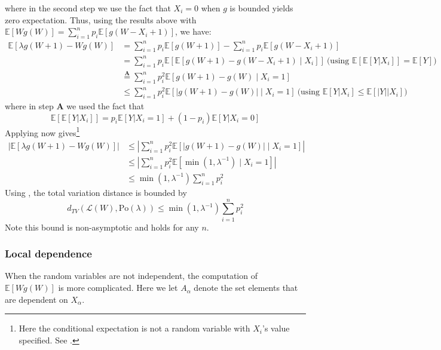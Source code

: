 \documentclass{article}
\begin{document}
    where in the second step we use the fact that $X_i=0$ when $g$ is bounded yields zero expectation. Thus, using the results above with $\mathbb{E}[Wg(W)] =  \sum_{i=1}^n p_i \mathbb{E}[g(W - X_i + 1)]$, we have:  
    \begin{align*}
        \mathbb{E}[\lambda g(W+1) - Wg(W)] &= \sum_{i=1}^n p_i \mathbb{E}[g(W + 1)] - \sum_{i=1}^n p_i \mathbb{E}[g(W - X_i + 1)]\\
        &= \sum_{i=1}^n p_i \mathbb{E}[\mathbb{E}[g(W+1) - g(W - X_i + 1) \mid X_i]] \ \text{(using $\mathbb{E}[\mathbb{E}[Y|X_i]]=\mathbb{E}[Y]$)}\\
        &\stackrel{\textbf{A}}{=} \sum_{i=1}^n p_i^2 \mathbb{E}[g(W+1) - g(W) \mid X_i=1] \\
        & \leq \sum_{i=1}^n p_i^2 \mathbb{E}[|g(W+1) - g(W)| \mid X_i=1] \ \text{(using $\mathbb{E}[Y|X_i]\leq\mathbb{E}[|Y||X_i]$)}
    \end{align*}
    where  in step $\textbf{A}$ we used the fact that 
    \[
    \mathbb{E}[\mathbb{E}[Y|X_i]]=p_i \mathbb{E}[Y|X_i=1] + (1-p_i) \mathbb{E}[Y|X_i=0]
    \]
    Applying  now gives\footnote{Here the conditional expectation is not a random variable with $X_i$'s value specified. See \citep{durrett2010probability}.}
    \begin{align*}
        |\mathbb{E}[\lambda g(W+1) - Wg(W)]| &\leq \left|\sum_{i=1}^n p_i^2 \mathbb{E}[|g(W+1) - g(W)| \mid X_i=1]\right|\\
        &\leq \left|\sum_{i=1}^n p_i^2 \mathbb{E}[\min (1, \lambda^{-1})\mid X_i=1]\right|\\
        &\leq \min (1, \lambda^{-1}) \sum_{i=1}^n p_i^2
    \end{align*}
    Using , the total variation distance is bounded by
    \begin{equation*}
        d_{TV}(\mathcal{L}(W), \text{Po}(\lambda)) \leq \min (1, \lambda^{-1}) \sum_{i=1}^n p_i^2
    \end{equation*}
    Note this bound is non-asymptotic and holds for any $n$.

\subsubsection{Local dependence}  
When the random variables are not independent, the computation of $\mathbb{E}[Wg(W)]$ is more complicated.  Here we let $A_\alpha$ denote the set elements that are dependent on $X_\alpha$.  
\end{document}
